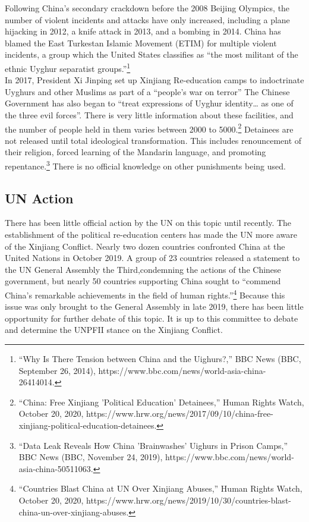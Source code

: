 \documentclass[10pt, letterpaper]{article}
\begin{document}
Following China's secondary crackdown before the 2008 Beijing Olympics,
the number of violent incidents and attacks have only increased,
including a plane hijacking in 2012, a knife attack in 2013, and a
bombing in 2014. China has blamed the East Turkestan Islamic Movement
(ETIM) for multiple violent incidents, a group which the United States
classifies as ``the most militant of the ethnic Uyghur separatist
groups.''\footnote{``Why Is There Tension between China and the
  Uighurs?,'' BBC News (BBC, September 26, 2014),
  https://www.bbc.com/news/world-asia-china-26414014.} \\

In 2017, President Xi Jinping set up Xinjiang Re-education camps to
indoctrinate Uyghurs and other Muslims as part of a ``people's war on
terror'' The Chinese Government has also began to ``treat expressions of
Uyghur identity\ldots{} as one of the three evil forces''. There is very
little information about these facilities, and the number of people held
in them varies between 2000 to 5000.\footnote{``China: Free Xinjiang
  'Political Education' Detainees,'' Human Rights Watch, October 20,
  2020,
  https://www.hrw.org/news/2017/09/10/china-free-xinjiang-political-education-detainees.}
Detainees are not released until total ideological transformation. This
includes renouncement of their religion, forced learning of the Mandarin
language, and promoting repentance.\footnote{``Data Leak Reveals How
  China 'Brainwashes' Uighurs in Prison Camps,'' BBC News (BBC, November
  24, 2019), https://www.bbc.com/news/world-asia-china-50511063.} There
is no official knowledge on other punishments being used. \\

\subsection{UN Action}

There has been little official action by the UN on this topic until
recently. The establishment of the political re-education centers has
made the UN more aware of the Xinjiang Conflict. Nearly two dozen
countries confronted China at the United Nations in October 2019. A
group of 23 countries released a statement to the UN General Assembly
the Third,condemning the actions of the Chinese government, but nearly
50 countries supporting China sought to ``commend China's remarkable
achievements in the field of human rights.''\footnote{``Countries Blast
  China at UN Over Xinjiang Abuses,'' Human Rights Watch, October 20,
  2020,
  https://www.hrw.org/news/2019/10/30/countries-blast-china-un-over-xinjiang-abuses.}
Because this issue was only brought to the General Assembly in late
2019, there has been little opportunity for further debate of this
topic. It is up to this committee to debate and determine the UNPFII
stance on the Xinjiang Conflict. \\
\end{document}
